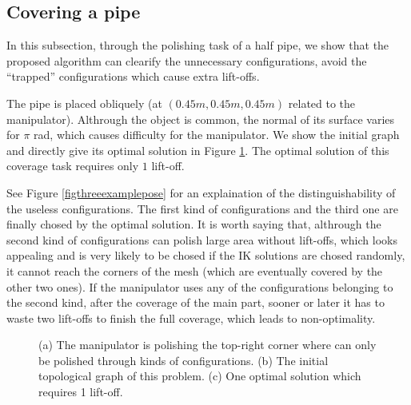 \documentclass[journal]{IEEEtran}
\begin{document}
\subsection{Covering a pipe}
In this subsection, through the polishing task of a half pipe, we show that the proposed algorithm can clearify the unnecessary configurations, avoid the ``trapped'' configurations which cause extra lift-offs. 

The pipe is placed obliquely (at $(0.45m, 0.45m, 0.45m)$ related to the manipulator). Althrough the object is common, the normal of its surface varies for $\pi$ rad, which causes difficulty for the manipulator. We show the initial graph and directly give its optimal solution in Figure \ref{fighalfpipe}. The optimal solution of this coverage task requires only $1$ lift-off. 

See Figure \ref{figthreeexamplepose} for an explaination of the distinguishability of the useless configurations. The first kind of configurations and the third one are finally chosed by the optimal solution. It is worth saying that, althrough the second kind of configurations can polish large area without lift-offs, which looks appealing and is very likely to be chosed if the IK solutions are chosed randomly, it cannot reach the corners of the mesh (which are eventually covered by the other two ones). If the manipulator uses any of the configurations belonging to the second kind, after the coverage of the main part, sooner or later it has to waste two lift-offs to finish the full coverage, which leads to non-optimality. 
\begin{figure}[t]
\centering
{}
\caption{(a) The manipulator is polishing the top-right corner where can only be polished through kinds of configurations. (b) The initial topological graph of this problem. (c) One optimal solution which requires 1 lift-off.}\label{fighalfpipe}
\end{figure}
\end{document}
